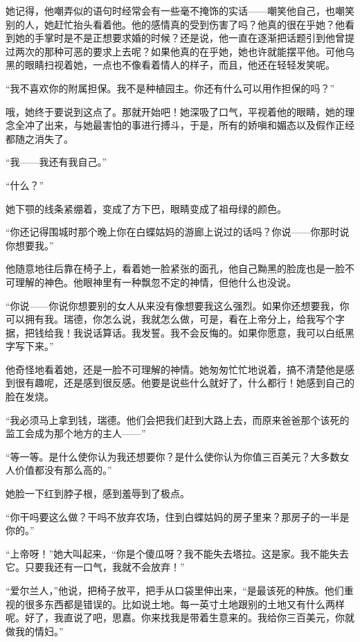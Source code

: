 \par 她记得，他嘲弄似的语句时经常会有一些毫不掩饰的实话——嘲笑他自己，也嘲笑别的人，她赶忙抬头看着他。他的感情真的受到伤害了吗？他真的很在乎她？他看到她的手掌时是不是正想要求婚的时候？还是说，他一直在逐渐把话题引到他曾提过两次的那种可恶的要求上去呢？如果他真的在乎她，她也许就能摆平他。可他乌黑的眼睛扫视着她，一点也不像看着情人的样子，而且，他还在轻轻发笑呢。
\par “我不喜欢你的附属担保。我不是种植园主。你还有什么可以用作担保的吗？”
\par 哦，她终于要说到这点了。那就开始吧！她深吸了口气，平视着他的眼睛，她的理念全冲了出来，与她最害怕的事进行搏斗，于是，所有的娇嗔和媚态以及假作正经都随之消失了。
\par “我——我还有我自己。”
\par “什么？”
\par 她下颚的线条紧绷着，变成了方下巴，眼睛变成了祖母绿的颜色。
\par “你还记得围城时那个晚上你在白蝶姑妈的游廊上说过的话吗？你说——你那时说你想要我。”
\par 他随意地往后靠在椅子上，看着她一脸紧张的面孔，他自己黝黑的脸庞也是一脸不可理解的神色。他眼神里有一种飘忽不定的神情，但他什么也没说。
\par “你说——你说你想要别的女人从来没有像想要我这么强烈。如果你还想要我，你可以拥有我。瑞德，你怎么说，我就怎么做，可是，看在上帝分上，给我写个字据，把钱给我！我说话算话。我发誓。我不会反悔的。如果你愿意，我可以白纸黑字写下来。”
\par 他奇怪地看着她，还是一脸不可理解的神情。她匆匆忙忙地说着，搞不清楚他是感到很有趣呢，还是感到很反感。他要是说些什么就好了，什么都行！她感到自己的脸在发烧。
\par “我必须马上拿到钱，瑞德。他们会把我们赶到大路上去，而原来爸爸那个该死的监工会成为那个地方的主人——”
\par “等一等。是什么使你认为我还想要你？是什么使你认为你值三百美元？大多数女人价值都没有那么高的。”
\par 她脸一下红到脖子根，感到羞辱到了极点。
\par “你干吗要这么做？干吗不放弃农场，住到白蝶姑妈的房子里来？那房子的一半是你的。”
\par “上帝呀！”她大叫起来，“你是个傻瓜呀？我不能失去塔拉。这是家。我不能失去它。只要我还有一口气，我就不会放弃！”
\par “爱尔兰人，”他说，把椅子放平，把手从口袋里伸出来，“是最该死的种族。他们重视的很多东西都是错误的。比如说土地。每一英寸土地跟别的土地又有什么两样呢。好了，我直说了吧，思嘉。你来找我是带着生意来的。我给你三百美元，你就做我的情妇。”
